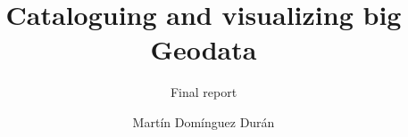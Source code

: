 \documentclass[
  oneside,
  open=any]{scrbook}
\title{Cataloguing and visualizing big Geodata}
\subtitle{Final report}
\author{Martín Domínguez Durán}
\date{}
\begin{document}

  \begin{frontmatter}

\begin{titlepage}


\newcommand{\titlepagepagealign}{
\ifthenelse{\equal{left}{right}}{\raggedleft}{}
\ifthenelse{\equal{left}{center}}{\centering}{}
\ifthenelse{\equal{left}{left}}{\raggedright}{}
}


\newcommand{\titleandsubtitle}{
{{\large{\bfseries{\nohyphens{Cataloguing and visualizing big
Geodata}}}}\par
}%

\vspace{\betweentitlesubtitle}
{
{\large{\textit{\nohyphens{Final report}}}}\par
}}
\newcommand{\titlepagetitleblock}{
\titleandsubtitle
}

\newcommand{\authorstyle}[1]{{\large{#1}}}

\newcommand{\affiliationstyle}[1]{{\large{#1}}}

\newcommand{\titlepageauthorblock}{
{\authorstyle{\nohyphens{Martín Domínguez Durán}{\textsuperscript{1}}}}}

\newcommand{\titlepageaffiliationblock}{
\hangindent=1em
\hangafter=1
{\affiliationstyle{
{1}.~Wageningen University \& Research,~Wageningen, The Netherlands


\vspace{1\baselineskip} 
}}
}
\newcommand{\headerstyled}{%
{The Publisher}
}
\newcommand{\footerstyled}{%
{\large{\textbf{Registration number:} 1254246\\
\textbf{Period of Internship:} 2024-04-08 - 2024-08-08\\
\textbf{Date final report:} 2024-07-31\\
\textbf{Telephone number student:} +31651120353\\
\textbf{Name of Company:} Satelligence B.V.\\
\textbf{Host supervisor:} Luca Foresta\\
\textbf{MGI supervisor:} Lukasz Grus}}
}
\newcommand{\datestyled}{%
{}
}


\newcommand{\titlepageheaderblock}{\headerstyled}

\newcommand{\titlepagefooterblock}{
\footerstyled
}

\newcommand{\titlepagedateblock}{
\datestyled
}


\end{titlepage}
\end{frontmatter}
\end{document}
